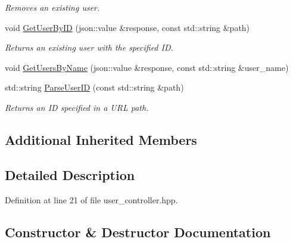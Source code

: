 \begin{DoxyCompactItemize}
\begin{DoxyCompactList}\small\item\em Removes an existing user. \end{DoxyCompactList}\item 
void \mbox{\hyperlink{classcadg__rest_1_1_user_controller_a1d3d450422fabffd4ff66a9267834ea6}{Get\+User\+By\+ID}} (json\+::value \&response, const std\+::string \&path)
\begin{DoxyCompactList}\small\item\em Returns an existing user with the specified ID. \end{DoxyCompactList}\item 
void \mbox{\hyperlink{classcadg__rest_1_1_user_controller_aa98afe262762a47ff443a36eb4a97b8d}{Get\+Users\+By\+Name}} (json\+::value \&response, const std\+::string \&user\+\_\+name)
\item 
std\+::string \mbox{\hyperlink{classcadg__rest_1_1_user_controller_a3523d014f2ada4364034e175f6d645f8}{Parse\+User\+ID}} (const std\+::string \&path)
\begin{DoxyCompactList}\small\item\em Returns an ID specified in a U\+RL path. \end{DoxyCompactList}\end{DoxyCompactItemize}
\subsection*{Additional Inherited Members}


\subsection{Detailed Description}


Definition at line 21 of file user\+\_\+controller.\+hpp.



\subsection{Constructor \& Destructor Documentation}
\mbox{\label{classcadg__rest_1_1_user_controller_a0163192955de3f5484fceaf7796fd881}} 
